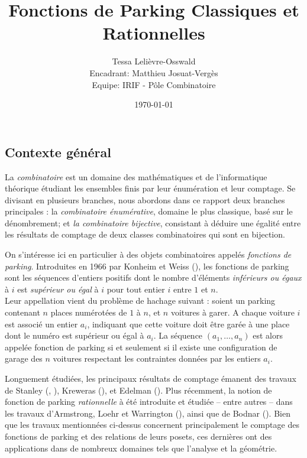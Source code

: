 \documentclass[11pt]{article}
\begin{document}
\title{Fonctions de Parking Classiques et Rationnelles}
\author{Tessa Lelièvre-Osswald\\
    {\small Encadrant: Matthieu Josuat-Vergès}\\
    {\small Equipe: IRIF - Pôle Combinatoire}}
\date{\today}

\maketitle

\subsection*{Contexte général}

La \emph{combinatoire} est un domaine des mathématiques et de 
l'informatique théorique étudiant les ensembles finis par leur énumération
et leur comptage.
Se divisant en plusieurs branches, nous abordons dans ce rapport deux
branches principales : la \emph{combinatoire énumérative}, domaine le plus
classique, basé sur le dénombrement; et \emph{la combinatoire bijective},
consistant à déduire une égalité entre les résultats de comptage de deux
classes combinatoires qui sont en bijection. 

On s'intéresse ici en particulier à des objets combinatoires appelés
\emph{fonctions de parking}. Introduites en 1966 par Konheim et Weiss
(\cite{ref1}), les fonctions de parking sont les séquences d'entiers
positifs dont le nombre d'éléments \emph{inférieurs ou égaux} à $i$ est
\emph{supérieur ou égal} à $i$ pour tout entier $i$ entre $1$ et $n$.\\
Leur appellation vient du problème de hachage suivant :
soient un parking contenant $n$ places numérotées de $1$ à $n$, et $n$
voitures à garer.
A chaque voiture $i$ est associé un entier $a_i$, indiquant que cette
voiture doit être garée à une place dont le numéro est supérieur ou égal
à $a_i$.
La séquence $(a_1, \ldots, a_n)$ est alors appelée fonction de parking si
et seulement si il existe une configuration de garage des $n$ voitures
respectant les contraintes données par les entiers $a_i$.

Longuement étudiées, les principaux résultats de comptage émanent des
travaux de Stanley (\cite{ref2}, \cite{ref3}), Kreweras (\cite{ref4}),
et Edelman (\cite{ref5}).
Plus récemment, la notion de fonction de parking \emph{rationnelle} à été
introduite et étudiée -- entre autres -- dans les travaux d'Armstrong, Loehr
et Warrington (\cite{ref7}), ainsi que de Bodnar (\cite{ref8}).
Bien que les travaux mentionnées ci-dessus concernent principalement le
comptage des fonctions de parking et des relations de leurs posets, 
ces dernières ont des applications dans de nombreux domaines tels que
l'analyse et la géométrie.
\end{document}
